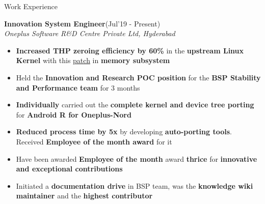 \documentclass{resume}
\newcommand{\sepval}{-0.5em}
\begin{document}
\begin{rSection}{Work Experience}

\vspace{-.4cm}
 
\item{\bf {\bf Innovation System Engineer}}\hfill{(Jul'19 - Present)}\\
	\emph{Oneplus Software R\&D Centre Private Ltd, Hyderabad}\\
[-0.4cm]

\begin{itemize}[leftmargin=*]

	\itemsep \sepval

	\item {\bf Increased THP zeroing efficiency by 60\%} in the {\bf upstream
		Linux Kernel} with this
		\href{https://github.com/hnaz/linux-mm/commit/8d9c9dbbeb54b980971085f1696758389e5d0675}{patch}
		in {\bf memory subsystem}

	\item Held the {\bf Innovation and Research POC position} for the {\bf BSP Stability
		and Performance team} for 3 months
	
	\item {\bf Individually} carried out the {\bf complete kernel and device tree
		porting} for {\bf Android R for Oneplus-Nord}
	
	\item {\bf Reduced process time by 5x} by developing {\bf auto-porting tools}. Received {\bf Employee of the month award} for
		it
		
	\item Have been awarded {\bf Employee of the month} award {\bf thrice} for {\bf innovative and exceptional
		contributions}

	\item Initiated a {\bf documentation drive} in BSP team, was the
		{\bf knowledge wiki maintainer} and the {\bf highest
		contributor}

\end{itemize}

\end{rSection}

\end{document}
